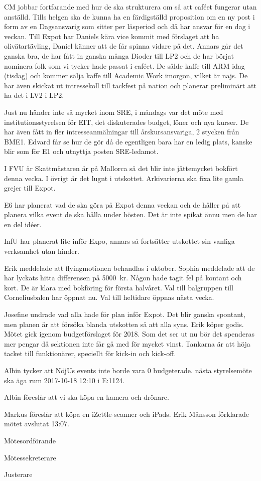 \documentclass[10pt]{article}
\def\mo{Erik Månsson}
\def\ms{Johan Karlberg}
\def\ji{Sophia Grimmeiss Grahm}
\begin{document}
\begin{paragrafer}
\begin{paragrafer}
CM jobbar fortfarande med hur de ska strukturera om så att caféet fungerar utan anställd. Tills helgen ska de kunna ha en färdigställd proposition om en ny post i form av en Dagsansvarig som sitter per läsperiod och då har ansvar för en dag i veckan. Till Expot har Daniels kära vice kommit med förslaget att ha olivätartävling, Daniel känner att de får spinna vidare på det. Annars går det ganska bra, de har fått in ganska många Dioder till LP2 och de har börjat nominera folk som vi tycker hade passat i caféet. De sålde kaffe till ARM idag (tisdag) och kommer sälja kaffe till Academic Work imorgon, vilket är najs. De har även skickat ut intressekoll till tackfest på nation och planerar preliminärt att ha det i LV2 i LP2.

Just nu händer inte så mycket inom SRE, i måndags var det möte med institutionsstyrelsen för EIT, det diskuterades budget, löner och nya kurser. De har även fått in fler intresseanmälningar till årskursansvariga, 2 stycken från BME1. Edvard får se hur de gör då de egentligen bara har en ledig plats, kanske blir som för E1 och utnyttja posten SRE-ledamot.

I FVU är Skattmästaren är på Mallorca så det blir inte jättemycket bokfört denna vecka. I övrigt är det lugnt i utskottet. Arkivarierna ska fixa lite gamla grejer till Expot.

E6 har planerat vad de ska göra på Expot denna veckan och de håller på att planera vilka event de ska hålla under hösten. Det är inte spikat ännu men de har en del idéer.

InfU har planerat lite inför Expo, annars så fortsätter utskottet sin vanliga verksamhet utan hinder.

Erik meddelade att flyingmotionen behandlas i oktober.
Sophia meddelade att de har lyckats hitta differensen på \SI{5000}{kr}. Någon hade tagit fel på kontant och kort. De är klara med bokföring för första halvåret.
Val till balgruppen till Corneliusbalen har öppnat nu. Val till heltidare öppnas nästa vecka.
\end{paragrafer}

Josefine undrade vad alla hade för plan inför Expot. Det blir ganska spontant, men planen är att försöka blanda utskotten så att alla syns. Erik köper godis.
Mötet gick igenom budgetförslaget för 2018. Som det ser ut nu bör det spenderas mer pengar då sektionen inte får gå med för mycket vinst. Tankarna är att höja tacket till funktionärer, speciellt för kick-in och kick-off.

Albin tycker att NöjUs events inte borde vara 0 budgeterade.
{\Mba} nästa styrelsemöte ska äga rum 2017-10-18 12:10 i E:1124.

{\Ibfu}

Albin föreslår att vi ska köpa en kamera och drönare.

Markus föreslår att köpa en iZettle-scanner och iPads.
{\mo} förklarade mötet avslutat 13:07.

\end{paragrafer}

\hidesignfoot
\begin{signatures}{3}
\signature{\mo}{Mötesordförande}
\signature{\ms}{Mötessekreterare}
\signature{\ji}{Justerare}
\end{signatures}
\end{document}
